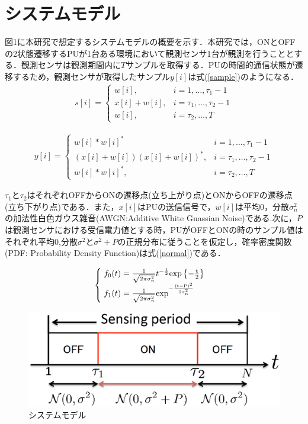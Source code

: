 \documentclass[technicalreport]{ieicej}
\begin{document}
\section{システムモデル}
\label{sec:model}
図1に本研究で想定するシステムモデルの概要を示す．本研究では，ONとOFFの2状態遷移するPUが1台ある環境において観測センサ1台が観測を行うこととする．観測センサは観測期間内に$T$サンプルを取得する．PUの時間的通信状態が遷移するため，観測センサが取得したサンプル$y[i]$は式(\ref{sample})のようになる．
\begin{align}
s[i]=
\left\{
\begin{array}{ll}
w[i], & i=1,\dots,\tau_1-1 \\
x[i]+w[i],& i=\tau_1,\dots,\tau_2-1 \\
w[i],& i=\tau_2,\dots,T 
\end{array}
\right.
\label{sample}
\end{align}


\begin{align}
y[i]=
\left\{
\begin{array}{ll}
w[i]*w[i]^{*}\, & i=1,\dots,\tau_1-1 \\
(x[i]+w[i])(x[i]+w[i])^{*},& i=\tau_1,\dots,\tau_2-1 \\
w[i]*w[i]^{*},& i=\tau_2,\dots,T 
\end{array}
\right.
\label{sample}
\end{align}

$\tau_1$と$\tau_2$はそれぞれOFFからONの遷移点(立ち上がり点)とONからOFFの遷移点(立ち下がり点)である．また，$x[i]$はPUの送信信号で，$w[i]$は平均0，分散$\sigma^{2}_{n}$の加法性白色ガウス雑音(AWGN:Additive White Guassian Noise)である.次に，$P$は観測センサにおける受信電力値とする時，PUがOFFとONの時のサンプル値はそれぞれ平均0,分散$\sigma^2$と$\sigma^2+P$の正規分布に従うことを仮定し，確率密度関数(PDF: Probability Density Function)は式(\ref{normal})である．

\begin{align}
\begin{cases}
\;f_0(t) = \frac{1}{\sqrt{2\pi\sigma^2_n}}t^{-\frac{1}{2}} \rm{exp}\left\{{-\frac{t}{2}}\right\} \\
\;f_1(t) = \frac{1}{\sqrt{2\pi\sigma^2_n}} \rm{exp}^{-\frac{(t-P)^2}{2\sigma^2_n}}
\end{cases}
\label{normal}
\end{align}

\begin{figure}[t]
\centering
\includegraphics[width=0.8\hsize,clip]{systemmodel.eps}
\caption{\normalsize{システムモデル}}
\label{systemmodel}
\end{figure}
\end{document}
